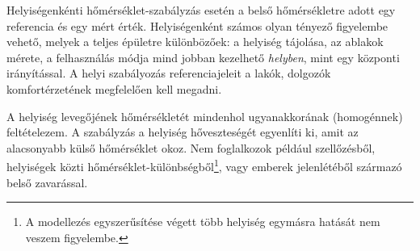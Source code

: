 


%





%
%
%
%


Helyiségenkénti hőmérséklet-szabályzás esetén a belső hőmérsékletre adott egy referencia és egy mért érték.
Helyiségenként számos olyan tényező figyelembe vehető, melyek a teljes épületre különbözőek: a helyiség tájolása, az ablakok mérete, a felhasználás módja mind jobban kezelhető \textit{helyben}, mint egy központi irányítással. A helyi szabályozás referenciajeleit a lakók, dolgozók komfortérzetének megfelelően kell megadni.

A helyiség levegőjének hőmérsékletét mindenhol ugyanakkorának (homogénnek) feltételezem. A szabályzás a helyiség hőveszteségét egyenlíti ki, amit az alacsonyabb külső hőmérséklet okoz. Nem foglalkozok például szellőzésből, helyiségek közti hőmérséklet-különbségből\footnote{A modellezés egyszerűsítése végett több helyiség egymásra hatását nem veszem figyelembe.}, vagy emberek jelenlétéből származó belső zavarással.

